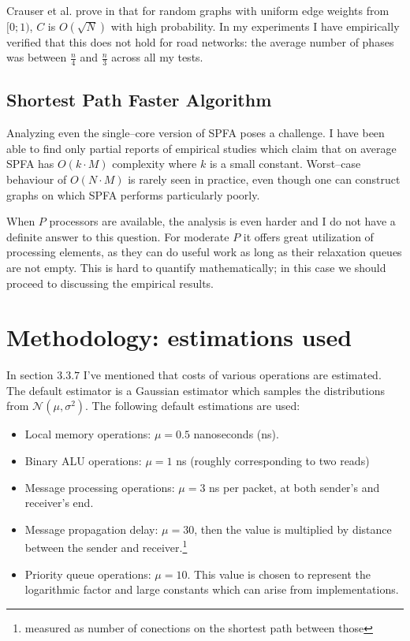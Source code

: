 \documentclass[12pt,a4paper,twoside,openright]{report}
\begin{document}
Crauser et al. prove in \cite{dijkstra} that for random graphs with uniform edge weights from $[0;1)$, $C$ is $O(\sqrt{N})$ with high probability. In my experiments I have empirically verified that this does not hold for road networks: the average number of phases was between $\frac{n}{4}$ and $\frac{n}{3}$ across all my tests.

\subsection{Shortest Path Faster Algorithm}
Analyzing even the single--core version of SPFA poses a challenge. I have been able to find only partial reports of empirical studies which claim that on average SPFA has $O(k\cdot M)$ complexity where $k$ is a small constant. Worst--case behaviour of $O(N\cdot M)$ is rarely seen in practice, even though one can construct graphs on which SPFA performs particularly poorly. 

When $P$ processors are available, the analysis is even harder and I do not have a definite answer to this question. For moderate $P$ it offers great utilization of processing elements, as they can do useful work as long as their relaxation queues are not empty. This is hard to quantify mathematically; in this case we should proceed to discussing the empirical results.

\section{Methodology: estimations used}
In section $3.3.7$ I've mentioned that costs of various operations are estimated. The default estimator is a Gaussian estimator which samples the distributions from $\mathcal{N}(\mu, \sigma ^2)$. The following default estimations are used:

\begin{itemize}
    \item Local memory operations: $\mu=0.5$ nanoseconds (ns). \item Binary ALU operations: $\mu=1$ ns (roughly corresponding to two reads)
    \item Message processing operations: $\mu=3$ ns per packet, at both sender's and receiver's end.
    \item Message propagation delay: $\mu=30$, then the value is multiplied by distance between the sender and receiver.\footnote{measured as number of conections on the shortest path between those}
    \item Priority queue operations: $\mu=10$. This value is chosen to represent the logarithmic factor and large constants which can arise from implementations.
\end{itemize}
\end{document}
